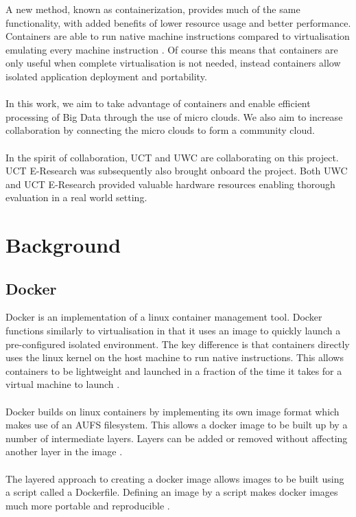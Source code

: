 \documentclass{sig-alternate-05-2015}
\begin{document}
A new method, known as containerization, provides much of the same functionality, with added benefits of lower resource usage and better performance. Containers are able to run native machine instructions compared to virtualisation emulating every machine instruction \cite{dua2014virtualization}. Of course this means that containers are only useful when complete virtualisation is not needed, instead containers allow isolated application deployment and portability.
\\\\
In this work, we aim to take advantage of containers and enable efficient processing of Big Data through the use of micro clouds. We also aim to increase collaboration by connecting the micro clouds to form a community cloud.
\\\\
In the spirit of collaboration, UCT and UWC are collaborating on this project. UCT E-Research was subsequently also brought onboard the project. Both UWC and UCT E-Research provided valuable hardware resources enabling thorough evaluation in a real world setting.


\section{Background}

\subsection{Docker}
Docker is an implementation of a linux container management tool. Docker functions similarly to virtualisation in that it uses an image to quickly launch a pre-configured isolated environment. The key difference is that containers directly uses the linux kernel on the host machine to run native instructions. This allows containers to be lightweight and launched in a fraction of the time it takes for a virtual machine to launch \cite{joy2015performance}. 
\\\\
Docker builds on linux containers by implementing its own image format which makes use of an AUFS filesystem. This allows a docker image to be built up by a number of intermediate layers. Layers can be added or removed without affecting another layer in the image \cite{boettiger2014introduction}.
\\\\
The layered approach to creating a docker image allows images to be built using a script called a Dockerfile. Defining an image by a script makes docker images much more portable and reproducible \cite{boettiger2014introduction}.
\end{document}
